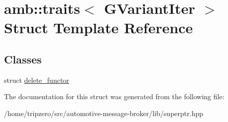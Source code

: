 \hypertarget{structamb_1_1traits_3_01GVariantIter_01_4}{\section{amb\-:\-:traits$<$ G\-Variant\-Iter $>$ Struct Template Reference}
\label{structamb_1_1traits_3_01GVariantIter_01_4}
}
\subsection*{Classes}
\begin{DoxyCompactItemize}
\item 
struct \hyperlink{structamb_1_1traits_3_01GVariantIter_01_4_1_1delete__functor}{delete\-\_\-functor}
\end{DoxyCompactItemize}


The documentation for this struct was generated from the following file\-:\begin{DoxyCompactItemize}
\item 
/home/tripzero/src/automotive-\/message-\/broker/lib/superptr.\-hpp\end{DoxyCompactItemize}
